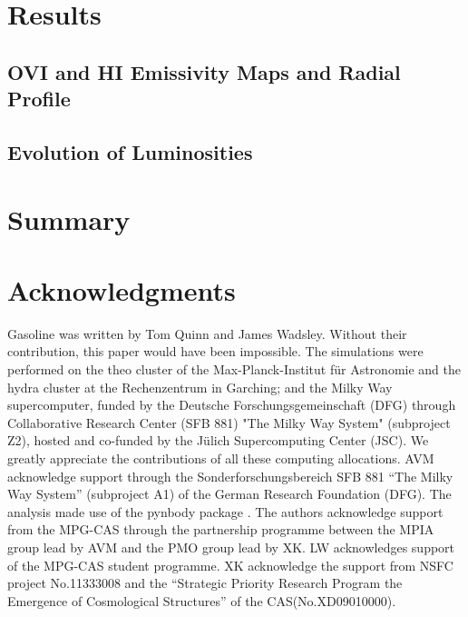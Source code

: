 \documentclass[useAMS,usenatbib]{mn2e}
\def \ion#1#2{#1{\footnotesize{#2}}\relax}
\def \hi       {\ion{H}{I}}
\def \ovi      {\ion{O}{VI}}
\begin{document}
\section{Results}
\label{sec:results}

\subsection{\protect\ovi{} and \protect\hi{} Emissivity Maps and Radial Profile}
\label{sec:map_rp}

\subsection{Evolution of Luminosities}
\label{sec:evo}


\section{Summary}
\label{sec:sum}



\section*{Acknowledgments} 

{\sc Gasoline} was written by Tom Quinn and James Wadsley. Without
their contribution, this paper would have been impossible.
The simulations were performed on the {\sc theo} cluster of the
Max-Planck-Institut f\"ur Astronomie and the {\sc hydra} cluster at
the Rechenzentrum in Garching; and the Milky Way supercomputer, funded
by the Deutsche Forschungsgemeinschaft (DFG) through Collaborative
Research Center (SFB 881) "The Milky Way System" (subproject Z2),
hosted and co-funded by the J\"ulich Supercomputing Center (JSC). We
greatly appreciate the contributions of all these computing
allocations. AVM acknowledge support through the
Sonderforschungsbereich SFB 881 “The Milky Way System” (subproject A1)
of the German Research Foundation (DFG).  The analysis made use of the
pynbody package \citep{Pontzen13}.
%
The authors acknowledge support from the MPG-CAS through the
partnership programme between the MPIA group lead by AVM and the PMO
group lead by XK.
LW acknowledges support of the MPG-CAS student
programme.
XK acknowledge the support from NSFC project
No.11333008 and the ``Strategic Priority Research Program the Emergence
of Cosmological Structures'' of the CAS(No.XD09010000).
\end{document}
